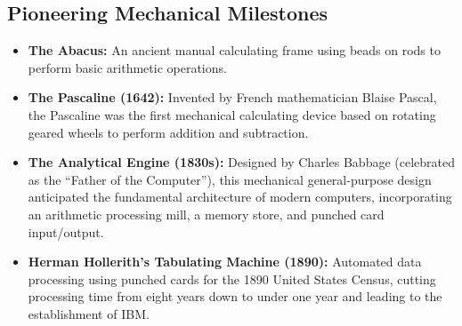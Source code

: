 \subsection{Pioneering Mechanical Milestones}
\begin{itemize}[leftmargin=1.2em]
    \item \textbf{The Abacus:} An ancient manual calculating frame using beads on rods to perform basic arithmetic operations.
    \item \textbf{The Pascaline (1642):} Invented by French mathematician Blaise Pascal, the Pascaline was the first mechanical calculating device based on rotating geared wheels to perform addition and subtraction.
    \item \textbf{The Analytical Engine (1830s):} Designed by Charles Babbage (celebrated as the ``Father of the Computer''), this mechanical general-purpose design anticipated the fundamental architecture of modern computers, incorporating an arithmetic processing mill, a memory store, and punched card input/output.
    \item \textbf{Herman Hollerith's Tabulating Machine (1890):} Automated data processing using punched cards for the 1890 United States Census, cutting processing time from eight years down to under one year and leading to the establishment of IBM.
\end{itemize}

